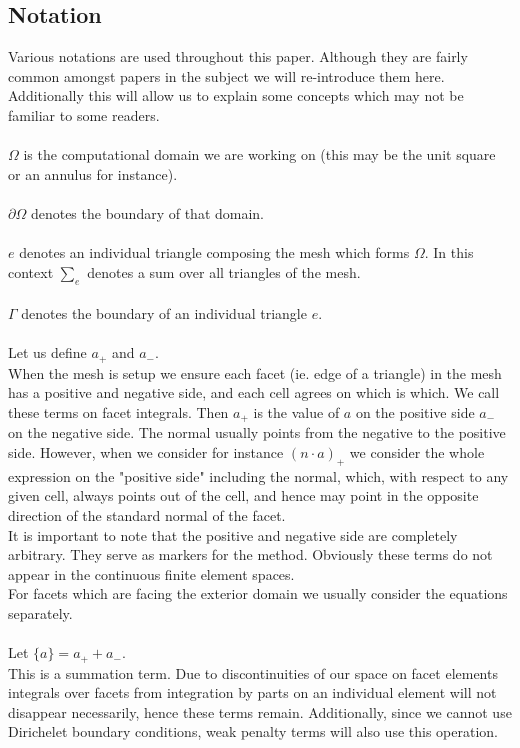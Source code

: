 \documentclass[11pt,twoside,a4paper]{article}
\begin{document}
\subsection{Notation}
Various notations are used throughout this paper. Although they are fairly common amongst papers in the subject we will re-introduce them here. Additionally this will allow us to explain some concepts which may not be familiar to some readers.\\
\\
$\Omega$ is the computational domain we are working on (this may be the unit square or an annulus for instance).\\
\\
$\partial \Omega$ denotes the boundary of that domain.\\
\\
$e$ denotes an individual triangle composing the mesh which forms $\Omega$. In this context $\sum_e$ denotes a sum over all triangles of the mesh.\\
\\
$\Gamma$ denotes the boundary of an individual triangle $e$.\\
\\
Let us define $a_+$ and $a_-$.\\
When the mesh is setup we ensure each facet (ie. edge of a triangle) in the mesh has a positive and negative side, and each cell agrees on which is which. We call these terms on facet integrals. Then $a_+$ is the value of $a$ on the positive side $a_-$ on the negative side. The normal usually points from the negative to the positive side. However, when we consider for instance $(n \cdot a)_+$ we consider the whole expression on the "positive side" including the normal, which, with respect to any given cell, always points out of the cell, and hence may point in the opposite direction of the standard normal of the facet.\\
It is important to note that the positive and negative side are completely arbitrary. They serve as markers for the method. Obviously these terms do not appear in the continuous finite element spaces.\\
For facets which are facing the exterior domain we usually consider the equations separately.\\
\\
Let $\{ a \} = a_+ + a_-$. \\
This is a summation term. Due to discontinuities of our space on facet elements integrals over facets from integration by parts on an individual element will not disappear necessarily, hence these terms remain. Additionally, since we cannot use Dirichelet boundary conditions, weak penalty terms will also use this operation.\\
\end{document}
